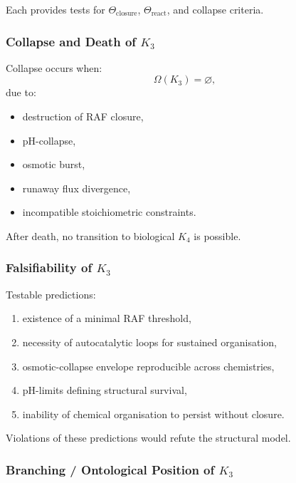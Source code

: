 Each provides tests for $\Theta_{\mathrm{closure}}$,
$\Theta_{\mathrm{react}}$, and collapse criteria.

\subsubsection{Collapse and Death of \texorpdfstring{$K_3$}{K_3}}
\label{sec:k3-collapse}

Collapse occurs when:
\[
\Omega(K_3) = \varnothing,
\]
due to:
\begin{itemize}
    \item destruction of RAF closure,
    \item pH-collapse,
    \item osmotic burst,
    \item runaway flux divergence,
    \item incompatible stoichiometric constraints.
\end{itemize}

After death, no transition to biological $K_4$ is possible.

\subsubsection{Falsifiability of \texorpdfstring{$K_3$}{K_3}}

Testable predictions:
\begin{enumerate}
    \item existence of a minimal RAF threshold,
    \item necessity of autocatalytic loops for sustained organisation,
    \item osmotic-collapse envelope reproducible across chemistries,
    \item pH-limits defining structural survival,
    \item inability of chemical organisation to persist without closure.
\end{enumerate}

Violations of these predictions would refute the structural model.

\subsubsection{Branching / Ontological Position of \texorpdfstring{$K_3$}{K_3}}

